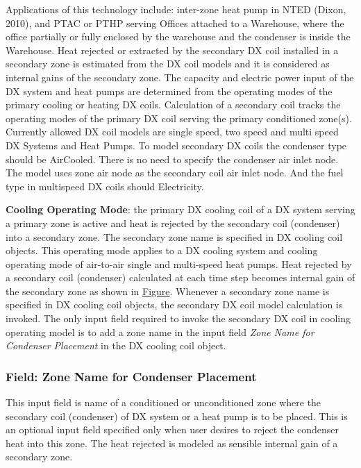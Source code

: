 Applications of this technology include: inter-zone heat pump in NTED (Dixon, 2010), and PTAC or PTHP serving Offices attached to a Warehouse, where the office partially or fully enclosed by the warehouse and the condenser is inside the Warehouse. Heat rejected or extracted by the secondary DX coil installed in a secondary zone is estimated from the DX coil models and it is considered as internal gains of the secondary zone. The capacity and electric power input of the DX system and heat pumps are determined from the operating modes of the primary cooling or heating DX coils. Calculation of a secondary coil tracks the operating modes of the primary DX coil serving the primary conditioned zone(s). Currently allowed DX coil models are single speed, two speed and multi speed DX Systems and Heat Pumps. To model secondary DX coils the condenser type should be AirCooled. There is no need to specify the condenser air inlet node. The model uses zone air node as the secondary coil air inlet node. And the fuel type in multispeed DX coils should Electricity.

\textbf{Cooling Operating Mode}: the primary DX cooling coil of a DX system serving a primary zone is active and heat is rejected by the secondary coil (condenser) into a secondary zone. The secondary zone name is specified in DX cooling coil objects. This operating mode applies to a DX cooling system and cooling operating mode of air-to-air single and multi-speed heat pumps. Heat rejected by a secondary coil (condenser) calculated at each time step becomes internal gain of the secondary zone as shown in \protect\hyperlink{SecondaryCoilsFigure2}{Figure}. Whenever a secondary zone name is specified in DX cooling coil objects, the secondary DX coil model calculation is invoked. The only input field required to invoke the secondary DX coil in cooling operating model is to add a zone name in the input field \emph{Zone Name for Condenser Placement} in the DX cooling coil object.

\subsubsection{Field: Zone Name for Condenser Placement}\label{field-zone-name-for-condenser-placement-3}

This input field is name of a conditioned or unconditioned zone where the secondary coil (condenser) of DX system or a heat pump is to be placed. This is an optional input field specified only when user desires to reject the condenser heat into this zone. The heat rejected is modeled as sensible internal gain of a secondary zone.

